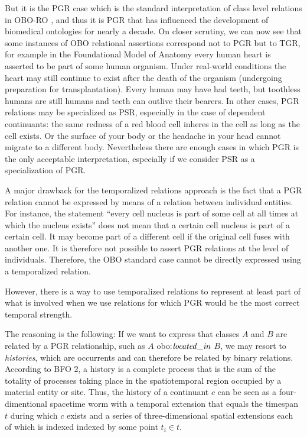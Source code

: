 But it is the PGR case which is the standard interpretation of class level 
relations in OBO-RO \cite{OBO:RO}, and thus it is PGR that has influenced the development of biomedical ontologies 
for nearly a decade. On closer scrutiny, we can now see that some instances of OBO 
relational assertions correspond not to PGR but to TGR, for example in the Foundational Model of Anatomy 
every human heart is asserted to be part of some human organism. Under real-world conditions the heart may still continue to exist 
after the death of the organism (undergoing preparation for transplantation). 
Every human may have had teeth, but toothless humans are still humans and teeth can outlive their bearers. 
In other cases, PGR relations may be specialized as PSR, especially in the case of dependent continuants: 
the same redness of a red blood cell inheres in the cell as long as the cell exists. 
Or the surface of your body or the headache in your head cannot migrate to 
a different body. Nevertheless there are enough cases in which PGR is the only acceptable interpretation, 
especially if we consider PSR as a specialization of PGR.

A major drawback for the temporalized relations approach is the fact that a PGR relation cannot be expressed 
by means of a relation between individual entities. For instance, the statement ``every cell 
nucleus is part of some cell at all times at which the nucleus exists'' does not mean that a certain cell nucleus is part of a 
certain cell. It may become part of a different cell if the original cell fuses with another one. 
It is therefore not possible to assert PGR relations at the level of individuals. 
Therefore, the OBO standard case cannot be directly expressed using a temporalized relation.

However, there is a way to use temporalized relations to represent at least part of what is 
involved when we use relations for which PGR would be the most correct temporal strength.

The reasoning is the following: If we want to express that classes $A$ and $B$ are related by a PGR 
relationship, such as $A$ obo:$\mathit{located\_in}$ $B$, we may resort to 
\emph{histories}, which are occurrents and can therefore be related by binary relations. According 
to BFO 2, a history is a complete process that is the sum of the totality of processes taking place 
in the spatiotemporal region occupied by a material entity or site. Thus, the history of a continuant 
$c$ can be seen as a four-dimentional spacetime worm with a temporal extension that equals the 
timespan $t$ during which $c$ exists and a series of three-dimensional spatial extensions each 
of which is indexed indexed by some point 
$t_i \in t$. 

